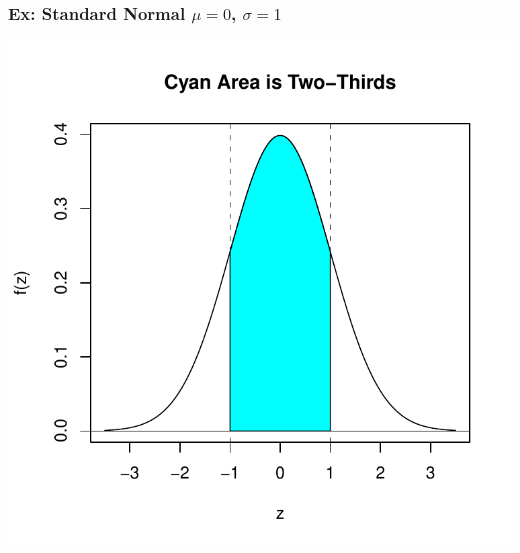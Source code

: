 \documentclass[slides]{beamer}
\begin{document}
\begin{frame}
\frametitle{Ex: Standard Normal $\mu=0$, $\sigma=1$}
\begin{center}
\includegraphics{figure/lec07-001}
\end{center}
\end{frame}
\end{document}
